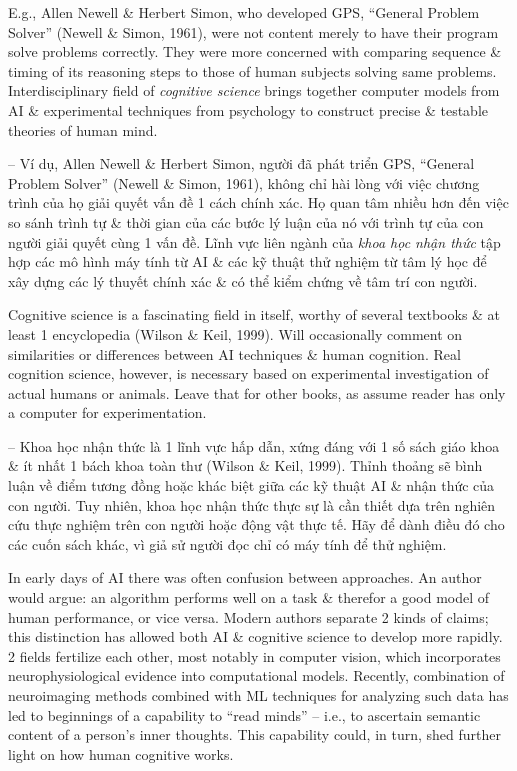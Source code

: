 \documentclass{article}
\begin{document}
\begin{itemize}
\begin{itemize}
\begin{itemize}
\begin{itemize}
				E.g., {\sc Allen Newell \& Herbert Simon}, who developed GPS, ``General Problem Solver'' (Newell \& Simon, 1961), were not content merely to have their program solve problems correctly. They were more concerned with comparing sequence \& timing of its reasoning steps to those of human subjects solving same problems. Interdisciplinary field of {\it cognitive science} brings together computer models from AI \& experimental techniques from psychology to construct precise \& testable theories of human mind.

				-- Ví dụ, {\sc Allen Newell \& Herbert Simon}, người đã phát triển GPS, ``General Problem Solver'' (Newell \& Simon, 1961), không chỉ hài lòng với việc chương trình của họ giải quyết vấn đề 1 cách chính xác. Họ quan tâm nhiều hơn đến việc so sánh trình tự \& thời gian của các bước lý luận của nó với trình tự của con người giải quyết cùng 1 vấn đề. Lĩnh vực liên ngành của {\it khoa học nhận thức} tập hợp các mô hình máy tính từ AI \& các kỹ thuật thử nghiệm từ tâm lý học để xây dựng các lý thuyết chính xác \& có thể kiểm chứng về tâm trí con người.

				Cognitive science is a fascinating field in itself, worthy of several textbooks \& at least 1 encyclopedia (Wilson \& Keil, 1999). Will occasionally comment on similarities or differences between AI techniques \& human cognition. Real cognition science, however, is necessary based on experimental investigation of actual humans or animals. Leave that for other books, as assume reader has only a computer for experimentation.

				-- Khoa học nhận thức là 1 lĩnh vực hấp dẫn, xứng đáng với 1 số sách giáo khoa \& ít nhất 1 bách khoa toàn thư (Wilson \& Keil, 1999). Thỉnh thoảng sẽ bình luận về điểm tương đồng hoặc khác biệt giữa các kỹ thuật AI \& nhận thức của con người. Tuy nhiên, khoa học nhận thức thực sự là cần thiết dựa trên nghiên cứu thực nghiệm trên con người hoặc động vật thực tế. Hãy để dành điều đó cho các cuốn sách khác, vì giả sử người đọc chỉ có máy tính để thử nghiệm.

				In early days of AI there was often confusion between approaches. An author would argue: an algorithm performs well on a task \& therefor a good model of human performance, or vice versa. Modern authors separate 2 kinds of claims; this distinction has allowed both AI \& cognitive science to develop more rapidly. 2 fields fertilize each other, most notably in computer vision, which incorporates neurophysiological evidence into computational models. Recently, combination of neuroimaging methods combined with ML techniques for analyzing such data has led to beginnings of a capability to ``read minds'' -- i.e., to ascertain semantic content of a person's inner thoughts. This capability could, in turn, shed further light on how human cognitive works.


\end{itemize}
\end{itemize}
\end{itemize}
\end{itemize}
\end{document}
